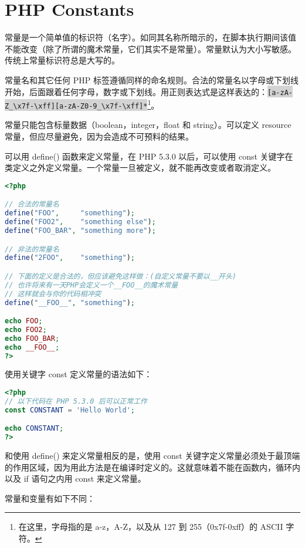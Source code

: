 \chapter{PHP Constants}

常量是一个简单值的标识符（名字）。如同其名称所暗示的，在脚本执行期间该值不能改变（除了所谓的魔术常量，它们其实不是常量）。常量默认为大小写敏感。传统上常量标识符总是大写的。

常量名和其它任何 PHP 标签遵循同样的命名规则。合法的常量名以字母或下划线开始，后面跟着任何字母，数字或下划线。用正则表达式是这样表达的：\colorbox{lightgray}{\texttt{[a-zA-Z\_\textbackslash x7f-\textbackslash xff][a-zA-Z0-9\_\textbackslash x7f-\textbackslash xff]*}}\footnote{在这里，字母指的是 a-z，A-Z，以及从 127 到 255（0x7f-0xff）的 ASCII 字符。}。

常量只能包含标量数据（boolean，integer，float 和 string）。可以定义 resource 常量，但应尽量避免，因为会造成不可预料的结果。

可以用 define() 函数来定义常量，在 PHP 5.3.0 以后，可以使用 const 关键字在类定义之外定义常量。一个常量一旦被定义，就不能再改变或者取消定义。

\begin{lstlisting}[language=PHP]
<?php

// 合法的常量名
define("FOO",     "something");
define("FOO2",    "something else");
define("FOO_BAR", "something more");

// 非法的常量名
define("2FOO",    "something");

// 下面的定义是合法的，但应该避免这样做：(自定义常量不要以__开头)
// 也许将来有一天PHP会定义一个__FOO__的魔术常量
// 这样就会与你的代码相冲突
define("__FOO__", "something");

echo FOO;
echo FOO2;
echo FOO_BAR;
echo __FOO__;
?>
\end{lstlisting}


使用关键字 const 定义常量的语法如下：

\begin{lstlisting}[language=PHP]
<?php
// 以下代码在 PHP 5.3.0 后可以正常工作
const CONSTANT = 'Hello World';

echo CONSTANT;
?>
\end{lstlisting}



和使用 define() 来定义常量相反的是，使用 const 关键字定义常量必须处于最顶端的作用区域，因为用此方法是在编译时定义的。这就意味着不能在函数内，循环内以及 if 语句之内用 const 来定义常量。

常量和变量有如下不同：

